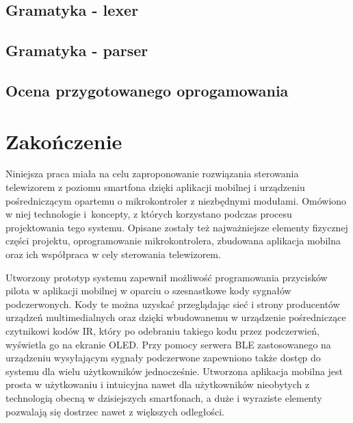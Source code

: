 \documentclass[12pt,twoside]{article}
\begin{document}
\subsection{Gramatyka - lexer}
\subsection{Gramatyka - parser}
\subsection{Ocena przygotowanego oprogamowania}
\clearpage

\section{Zakończenie}

Niniejsza praca miała na celu zaproponowanie rozwiązania sterowania telewizorem z poziomu smartfona dzięki aplikacji mobilnej i urządzeniu pośredniczącym opartemu o mikrokontroler z niezbędnymi modułami. Omówiono w niej technologie i~koncepty, z których korzystano podczas procesu projektowania tego systemu. Opisane zostały też najważniejsze elementy fizycznej części projektu, oprogramowanie mikrokontrolera, zbudowana aplikacja mobilna oraz ich współpraca w cely sterowania telewizorem.

Utworzony prototyp systemu zapewnił możliwość programowania przycisków pilota w aplikacji mobilnej w oparciu o szesnastkowe kody sygnałów podczerwonych. Kody te można uzyskać przeglądając sieć i strony producentów urządzeń multimedialnych oraz dzięki wbudowanemu w urządzenie pośredniczące czytnikowi kodów IR, który po odebraniu takiego kodu przez podczerwień, wyświetla go na ekranie OLED. Przy pomocy serwera BLE zastosowanego na urządzeniu wysyłającym sygnały podczerwone zapewniono także dostęp do systemu dla wielu użytkowników jednocześnie. Utworzona aplikacja mobilna jest prosta w użytkowaniu i intuicyjna nawet dla użytkowników nieobytych z technologią obecną w dzisiejszych smartfonach, a duże i wyraziste elementy pozwalają się dostrzec nawet z większych odległości.
\end{document}
